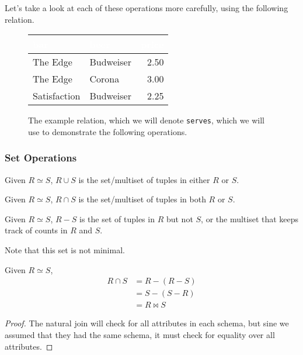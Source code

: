     Let's take a look at each of these operations more carefully, using the following relation. 

    \begin{figure}[H]
      \centering
      \begin{tabular}{|l|l|r|}
      \hline
      \rowcolor[HTML]{E26B0A} 
      \textcolor{white}{\textbf{bar}} & \textcolor{white}{\textbf{beer}} & \textcolor{white}{\textbf{price}} \\ \hline
      \rowcolor[HTML]{FBCEB1}
      The Edge & Budweiser & 2.50 \\ \hline
      \rowcolor[HTML]{FBCEB1}
      The Edge & Corona & 3.00 \\ \hline
      \rowcolor[HTML]{FBCEB1}
      Satisfaction & Budweiser & 2.25 \\ \hline
      \end{tabular}
      \caption{The example relation, which we will denote \texttt{serves}, which we will use to demonstrate the following operations.} 
      \label{fig:serves}
    \end{figure} 

  \subsubsection{Set Operations}

    \begin{definition}[Union]
      Given $R \simeq S$, $R \cup S$ is the set/multiset of tuples in either $R$ or $S$. 
    \end{definition}

    \begin{definition}[Intersection]
      Given $R \simeq S$, $R \cap S$ is the set/multiset of tuples in both $R$ or $S$. 
    \end{definition}

    \begin{definition}[Difference]
      Given $R \simeq S$, $R - S$ is the set of tuples in $R$ but not $S$, or the multiset that keeps track of counts in $R$ and $S$. 
    \end{definition}

    Note that this set is not minimal. 

    \begin{lemma} 
      Given $R \simeq S$, 
      \begin{align}
        R \cap S  & = R - (R - S) \\ 
                  & = S - (S - R) \\ 
                  & = R \bowtie S
      \end{align}
    \end{lemma}
    \begin{proof}
      The natural join will check for all attributes in each schema, but sine we assumed that they had the same schema, it must check for equality over all attributes.
    \end{proof}

